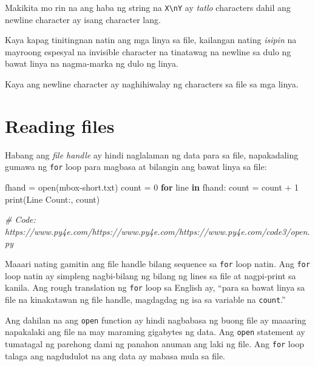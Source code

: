 \documentclass[10pt,]{book}
\newenvironment{Shaded}{}{}
\newcommand{\BuiltInTok}[1]{\textcolor[rgb]{0.00,0.50,0.00}{#1}}
\newcommand{\CommentTok}[1]{\textcolor[rgb]{0.38,0.63,0.69}{\textit{#1}}}
\newcommand{\ControlFlowTok}[1]{\textcolor[rgb]{0.00,0.44,0.13}{\textbf{#1}}}
\newcommand{\DecValTok}[1]{\textcolor[rgb]{0.25,0.63,0.44}{#1}}
\newcommand{\KeywordTok}[1]{\textcolor[rgb]{0.00,0.44,0.13}{\textbf{#1}}}
\newcommand{\NormalTok}[1]{#1}
\newcommand{\OperatorTok}[1]{\textcolor[rgb]{0.40,0.40,0.40}{#1}}
\newcommand{\StringTok}[1]{\textcolor[rgb]{0.25,0.44,0.63}{#1}}
\begin{document}
Makikita mo rin na ang haba ng string na \texttt{X\textbackslash{}nY} ay
\emph{tatlo} characters dahil ang newline character ay isang character
lang.

Kaya kapag tinitingnan natin ang mga linya sa file, kailangan nating
\emph{isipin} na mayroong espesyal na invisible character na tinatawag
na newline sa dulo ng bawat linya na nagma-marka ng dulo ng linya.

Kaya ang newline character ay naghihiwalay ng characters sa file sa mga
linya.

\section{Reading files}\label{reading-files}

 

Habang ang \emph{file handle} ay hindi naglalaman ng data para sa file,
napakadaling gumawa ng \texttt{for} loop para magbasa at bilangin ang
bawat linya sa file:

\begin{Shaded}
\begin{Highlighting}[]
\NormalTok{fhand }\OperatorTok{=} \BuiltInTok{open}\NormalTok{(}\StringTok{\textquotesingle{}mbox{-}short.txt\textquotesingle{}}\NormalTok{)}
\NormalTok{count }\OperatorTok{=} \DecValTok{0}
\ControlFlowTok{for}\NormalTok{ line }\KeywordTok{in}\NormalTok{ fhand:}
\NormalTok{    count }\OperatorTok{=}\NormalTok{ count }\OperatorTok{+} \DecValTok{1}
\BuiltInTok{print}\NormalTok{(}\StringTok{\textquotesingle{}Line Count:\textquotesingle{}}\NormalTok{, count)}

\CommentTok{\# Code: https://www.py4e.com/https://www.py4e.com/https://www.py4e.com/code3/open.py}
\end{Highlighting}
\end{Shaded}


Maaari nating gamitin ang file handle bilang sequence sa \texttt{for}
loop natin. Ang \texttt{for} loop natin ay simpleng nagbi-bilang ng
bilang ng lines sa file at nagpi-print sa kanila. Ang rough translation
ng \texttt{for} loop sa English ay, ``para sa bawat linya sa file na
kinakatawan ng file handle, magdagdag ng isa sa variable na
\texttt{count}.''

Ang dahilan na ang \texttt{open} function ay hindi nagbabasa ng buong
file ay maaaring napakalaki ang file na may maraming gigabytes ng data.
Ang \texttt{open} statement ay tumatagal ng parehong dami ng panahon
anuman ang laki ng file. Ang \texttt{for} loop talaga ang nagdudulot na
ang data ay mabasa mula sa file.
\end{document}
